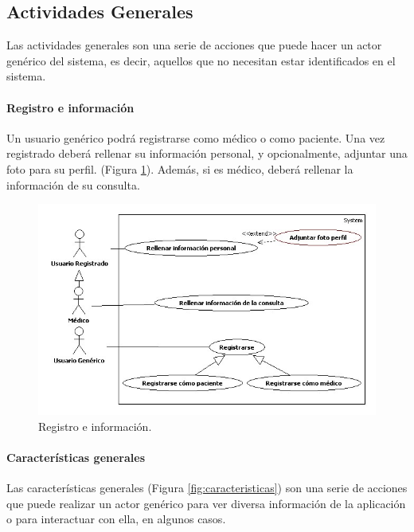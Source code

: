 
			\subsection{Actividades Generales} %
			\label{sec:actividades_generales}

				Las actividades generales son una serie de acciones que puede hacer un actor genérico del sistema, es decir, aquellos que no necesitan estar identificados en el sistema.
				\paragraph{Registro e información} %
				\label{par:registro_e_informacion}
					Un usuario genérico podrá registrarse como médico o como paciente. Una vez registrado deberá rellenar su información personal, y opcionalmente, adjuntar una foto para su perfil. (Figura \ref{fig:reg_inf}). Además, si es médico, deberá rellenar la información de su consulta.
					\begin{figure}[H]
					  \centering
					    \includegraphics[width=14cm]{img/jpg/casos_uso/Registro_e_informacion.jpg}
					  \caption{Registro e información.}
					  \label{fig:reg_inf}
					\end{figure}

				\paragraph{Características generales} %
				\label{par:caracteristicas_generales}
					Las características generales (Figura \ref{fig:caracteristicas}) son una serie de acciones que puede realizar un actor genérico para ver diversa información de la aplicación o para interactuar con ella, en algunos casos.

